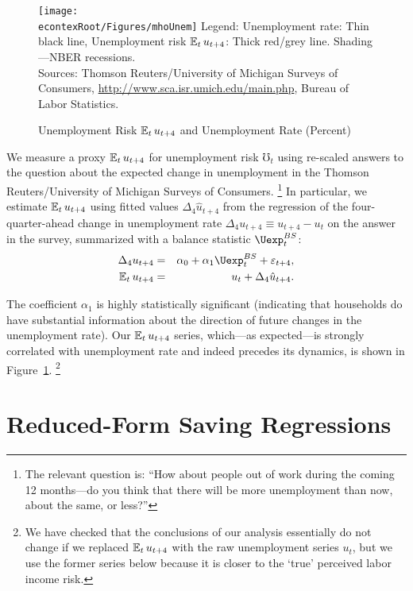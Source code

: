 \documentclass[titlepage]{\econtex}
\begin{document}
\begin{figure}
\caption{Unemployment Risk $\operatorname{\mathbb{E}}_t u_{t+4}$ and Unemployment Rate (Percent)}
\label{fMho}
\texttt{[image: \\econtexRoot/Figures/mhoUnem]}
\footnotesize
Legend: Unemployment rate: Thin black line, Unemployment risk $\operatorname{\mathbb{E}}_t u_{t+4}$: Thick red/grey line. Shading---NBER recessions.\\[0mm]
\tiny Sources: Thomson Reuters/University of Michigan Surveys of Consumers, \url{http://www.sca.isr.umich.edu/main.php}, Bureau of Labor Statistics.
\end{figure}


We measure a proxy $\operatorname{\mathbb{E}}_t u_{t+4}$ for unemployment risk $\mho_t$ using re-scaled answers to the question about the expected change in unemployment in the Thomson Reuters/University of Michigan Surveys of Consumers.%
\footnote{The relevant question is: ``How about people out of work during the coming 12 months---do you think that there will be more unemployment than now, about the same, or less?''}
In particular, we estimate $\operatorname{\mathbb{E}}_t u_{t+4}$ using fitted values $\Delta_4 \hat{u}_{t+4}$ from the regression of the four-quarter-ahead change in unemployment rate $\Delta_4 u_{t+4}\equiv u_{t+4}-u_t$ on the answer in the survey, summarized with a balance statistic $\Uexp^{BS}_t$:
\begin{eqnarray*}
\Delta_4 u_{t+4} &=& \alpha_0+\alpha_1\Uexp^{BS}_t+\varepsilon_{t+4},\\
\Ex_t u_{t+4}&=&u_t+ \Delta_4 \hat{u}_{t+4}.
\end{eqnarray*}

The coefficient $\alpha_{1}$ is highly statistically significant (indicating that households do have substantial information about the direction of future changes in the unemployment rate).  Our $\operatorname{\mathbb{E}}_{t} u_{t+4}$ series, which---as expected---is strongly correlated with unemployment rate and indeed precedes its dynamics, is shown in Figure~\ref{fMho}.%
\footnote{We have checked that the conclusions of our analysis essentially do not change if we replaced $\operatorname{\mathbb{E}}_{t} u_{t+4}$ with the raw unemployment series $u_t$, but we use the former series below because it is closer to the `true' perceived labor income risk.
}


\section{Reduced-Form Saving Regressions } \label{sReducedFormRegressions}
\end{document}
